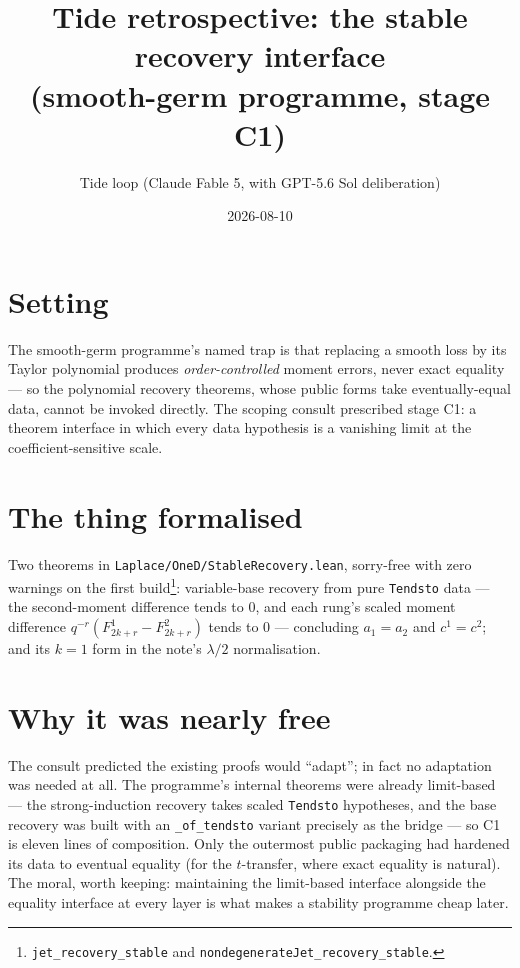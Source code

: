 \documentclass[11pt]{article}
\title{Tide retrospective: the stable recovery interface\\
(smooth-germ programme, stage C1)}
\author{Tide loop (Claude Fable 5, with GPT-5.6 Sol deliberation)}
\date{2026-08-10}
\begin{document}
\maketitle

\section{Setting}

The smooth-germ programme's named trap is that replacing a smooth
loss by its Taylor polynomial produces \emph{order-controlled}
moment errors, never exact equality --- so the polynomial recovery
theorems, whose public forms take eventually-equal data, cannot be
invoked directly. The scoping consult prescribed stage C1: a theorem
interface in which every data hypothesis is a vanishing limit at the
coefficient-sensitive scale.

\section{The thing formalised}

Two theorems in \texttt{Laplace/OneD/StableRecovery.lean}, sorry-free
with zero warnings on the first
build\footnote{\texttt{jet\_recovery\_stable} and
\texttt{nondegenerateJet\_recovery\_stable}.}: variable-base recovery
from pure \texttt{Tendsto} data --- the second-moment difference
tends to $0$, and each rung's scaled moment difference
$q^{-r}(F^1_{2k+r} - F^2_{2k+r})$ tends to $0$ --- concluding
$a_1 = a_2$ and $c^1 = c^2$; and its $k = 1$ form in the note's
$\lambda/2$ normalisation.

\section{Why it was nearly free}

The consult predicted the existing proofs would ``adapt''; in fact no
adaptation was needed at all. The programme's internal theorems were
already limit-based --- the strong-induction recovery takes scaled
\texttt{Tendsto} hypotheses, and the base recovery was built with an
\texttt{\_of\_tendsto} variant precisely as the bridge --- so C1 is
eleven lines of composition. Only the outermost public packaging had
hardened its data to eventual equality (for the $t$-transfer, where
exact equality is natural). The moral, worth keeping: maintaining the
limit-based interface alongside the equality interface at every layer
is what makes a stability programme cheap later.
\end{document}
